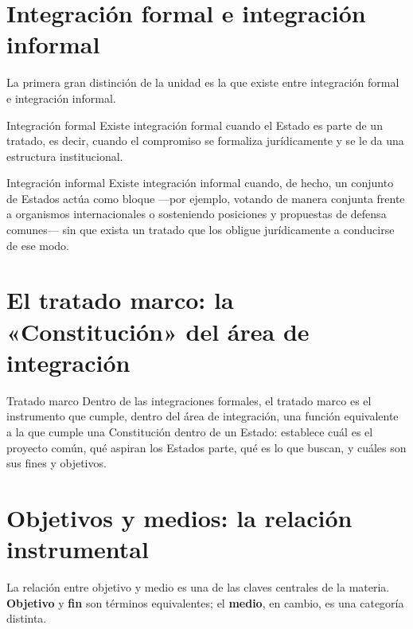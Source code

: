 \documentclass[12pt,oneside]{book}
\begin{document}
\section{Integración formal e integración informal}

La primera gran distinción de la unidad es la que existe entre integración formal e integración informal.

\begin{definition}{Integración formal}
Existe integración formal cuando el Estado es parte de un tratado, es decir, cuando el compromiso se formaliza jurídicamente y se le da una estructura institucional.
\end{definition}

\begin{definition}{Integración informal}
Existe integración informal cuando, de hecho, un conjunto de Estados actúa como bloque —por ejemplo, votando de manera conjunta frente a organismos internacionales o sosteniendo posiciones y propuestas de defensa comunes— sin que exista un tratado que los obligue jurídicamente a conducirse de ese modo.
\end{definition}

\section{El tratado marco: la «Constitución» del área de integración}

\begin{definition}{Tratado marco}
Dentro de las integraciones formales, el tratado marco es el instrumento que cumple, dentro del área de integración, una función equivalente a la que cumple una Constitución dentro de un Estado: establece cuál es el proyecto común, qué aspiran los Estados parte, qué es lo que buscan, y cuáles son sus fines y objetivos.
\end{definition}

\section{Objetivos y medios: la relación instrumental}

La relación entre objetivo y medio es una de las claves centrales de la materia. \textbf{Objetivo} y \textbf{fin} son términos equivalentes; el \textbf{medio}, en cambio, es una categoría distinta.
\end{document}

